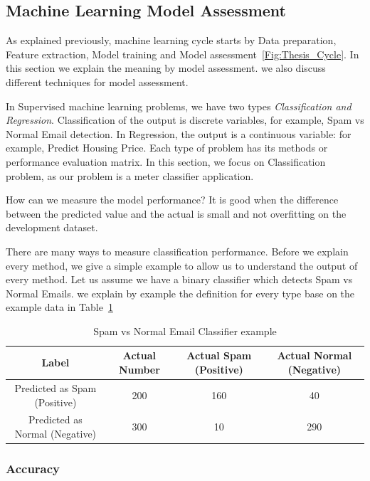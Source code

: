 \subsection{Machine Learning Model Assessment}

As explained previously, machine learning cycle starts by Data preparation, Feature extraction, Model training and Model assessment~\ref{Fig:Thesis_Cycle}. In this section we explain the meaning by model assessment. we also discuss different techniques for model assessment.

In Supervised machine learning problems, we have two types \textit{Classification and Regression}. Classification of the output is discrete variables, for example, Spam vs Normal Email detection. In Regression, the output is a continuous variable: for example, Predict Housing Price. Each type of problem has its methods or performance evaluation matrix. In this section, we focus on Classification problem, as our problem is a meter classifier application.

How can we measure the model performance? It is good when the difference between the predicted value and the actual is small and not overfitting on the development dataset.

There are many ways to measure classification performance. Before we explain every method, we give a simple example to allow us to understand the output of every method. Let us assume we have a binary classifier which detects Spam vs Normal Emails. we explain by example the definition for every type base on the example data in Table~\ref{Tab:EmailClassifier}%
\begin{table}[t]
 \centering
 \begin{tabular}{c c c c}
  \toprule
  \textbf{Label}& \textbf{Actual Number}& \textbf{Actual Spam (Positive)} & \textbf{Actual Normal (Negative)}\\
  \midrule
  Predicted as Spam (Positive)  & 200 & \cellcolor{green!25}160 & \cellcolor{red!25}40 \\
  Predicted as Normal (Negative)   & 300  & \cellcolor{red!25}10  & \cellcolor{green!25}290\\
  \bottomrule
 \end{tabular}
 \caption{Spam vs Normal Email Classifier example}\label{Tab:EmailClassifier}
\end{table}%
%
\subsubsection{Accuracy}

